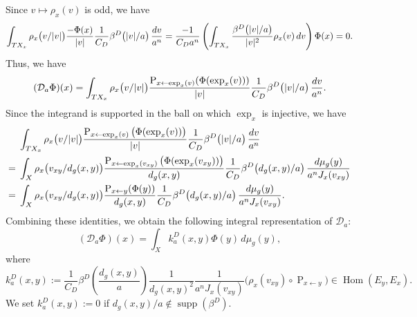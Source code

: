 \documentclass[a4paper,oneside,12pt]{amsart}
\theoremstyle{plain}
\theoremstyle{definition}
\theoremstyle{remark}
\DeclarePairedDelimiter{\abs}{\lvert}{\rvert}
\DeclareMathOperator{\Hom}{Hom}
\DeclareMathOperator{\support}{supp}
\newcommand{\dvol}{d\mu}
\newcommand{\paralleltransport}[2]{\operatorname{P}_{#2 \gets #1}}
\newcommand{\cliffordmultiplication}{\rho}
\newcommand{\mesoscopicDiracoperator}[1][a]{\mathcal{D}_{#1}}
\newcommand{\cutoff}{\beta}
\newcommand{\cutoffDirac}{\cutoff^D}
\newcommand{\integralkernel}{k}
\newcommand{\kernelDirac}{\integralkernel_a^D}
\begin{document}
Since $v \mapsto \cliffordmultiplication_x(v)$ is odd, we have
\begin{equation}
  \int_{TX_x} \cliffordmultiplication_x\big(v/\abs{v}\big) \frac{- \Phi(x)}{\abs{v}} \frac{1}{C_D} \cutoffDirac\big(\abs{v}/a\big)\,\frac{dv}{a^n} =  \frac{-1}{C_D a^n} \left( \int_{TX_x} \frac{\cutoffDirac\big(\abs{v}/a\big)}{\abs{v}^2} \cliffordmultiplication_x(v) \,dv \right) \Phi(x) = 0.
\end{equation}
Thus, we have
\begin{equation}
  (\mesoscopicDiracoperator \Phi)(x) = \int_{TX_x} \cliffordmultiplication_x\big(v/\abs{v}\big) \frac{\paralleltransport{\exp_x(v)}{x}(\Phi(\exp_x(v)))}{\abs{v}} \frac{1}{C_D} \cutoffDirac\big(\abs{v}/a\big)\,\frac{dv}{a^n}.
\end{equation}
Since the integrand is supported in the ball on which $\exp_x$ is injective, we have
\begin{equation}
  \begin{aligned}
& \int_{TX_x} \cliffordmultiplication_x\big(v/\abs{v}\big) \frac{\paralleltransport{\exp_x(v)}{x}\big(\Phi(\exp_x(v))\big)}{\abs{v}} \frac{1}{C_D} \cutoffDirac\big(\abs{v}/a\big)\,\frac{dv}{a^n} \\
  ={}& \int_X \cliffordmultiplication_x\big(v_{xy}/d_g(x,y)\big) \frac{\paralleltransport{\exp_x(v_{xy})}{x}\big(\Phi(\exp_x(v_{xy}))\big)}{d_g(x,y)} \frac{1}{C_D} \cutoffDirac\big(d_g(x,y)/a\big) \,\frac{\dvol_g(y)}{a^nJ_x(v_{xy})} \\
  ={}& \int_X \cliffordmultiplication_x\big(v_{xy}/d_g(x,y)\big) \frac{\paralleltransport{y}{x}(\Phi(y))}{d_g(x,y)} \frac{1}{C_D} \cutoffDirac\big(d_g(x,y)/a\big) \,\frac{\dvol_g(y)}{a^nJ_x(v_{xy})}.
  \end{aligned}
\end{equation}
Combining these identities, we obtain the following integral representation of $\mesoscopicDiracoperator$:
\begin{equation}
  (\mesoscopicDiracoperator \Phi)(x) = \int_X \kernelDirac(x,y) \Phi(y) \,\dvol_g(y),
\end{equation}
where
\begin{equation}
  \kernelDirac(x,y) := \frac{1}{C_D} \cutoffDirac\left(\frac{d_g(x,y)}{a}\right) \frac{1}{d_g(x,y)^2} \frac{1}{a^nJ_x(v_{xy})} \big( \cliffordmultiplication_x(v_{xy}) \circ \paralleltransport{y}{x} \big) \in \Hom(E_y,E_x).
\end{equation}
We set $\kernelDirac(x,y) := 0$ if $d_g(x,y)/a \notin \support(\cutoffDirac)$.
\end{document}
